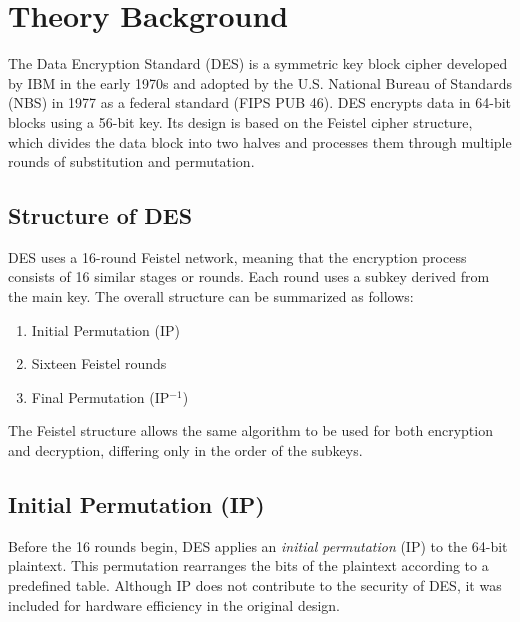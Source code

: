 \documentclass[12pt]{article}
\begin{document}
\setcounter{page}{2}
\pagestyle{fancy}
\fancyhf{}
\rhead{\thepage}




\section*{Theory Background}
\hspace{0.8cm}

The Data Encryption Standard (DES) is a symmetric key block cipher developed by IBM in the early 1970s and adopted by the U.S. National Bureau of Standards (NBS) in 1977 as a federal standard (FIPS PUB 46). DES encrypts data in 64-bit blocks using a 56-bit key. Its design is based on the Feistel cipher structure, which divides the data block into two halves and processes them through multiple rounds of substitution and permutation.

\subsection*{Structure of DES}
DES uses a 16-round Feistel network, meaning that the encryption process consists of 16 similar stages or rounds. Each round uses a subkey derived from the main key. The overall structure can be summarized as follows:

\begin{enumerate}
    \item Initial Permutation (IP)
    \item Sixteen Feistel rounds
    \item Final Permutation (IP$^{-1}$)
\end{enumerate}

The Feistel structure allows the same algorithm to be used for both encryption and decryption, differing only in the order of the subkeys.

\subsection*{Initial Permutation (IP)}
Before the 16 rounds begin, DES applies an \textit{initial permutation} (IP) to the 64-bit plaintext. This permutation rearranges the bits of the plaintext according to a predefined table. Although IP does not contribute to the security of DES, it was included for hardware efficiency in the original design.
\end{document}
